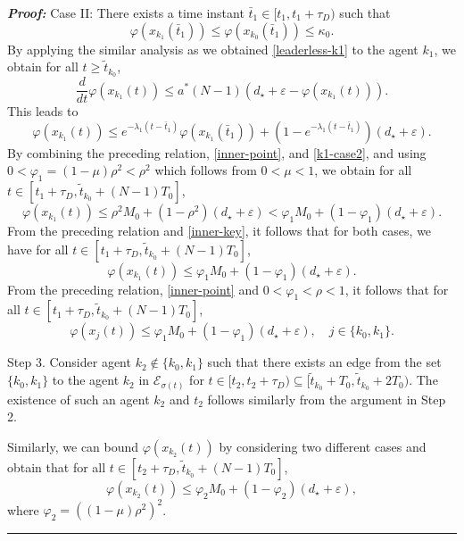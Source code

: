 \documentclass[a4paper, 11pt]{article}
\newenvironment{IEEEproof}[1][\bf Proof]{\smallskip\par\noindent\textit{#1: }}{\hspace*{\fill} \rule{6pt}{6pt}\smallskip}
\newcommand{\eps}{\varepsilon}
\begin{document}
\begin{IEEEproof}
Case II: There exists a time instant $\bar{t}_1 \in [t_1,t_1+\tau_D)$ such that
\begin{equation}\label{k1-case2}
\varphi(x_{k_1}(\bar{t}_1)) \leq \varphi(x_{k_0}(\bar{t}_1))\leq \kappa_0.
\end{equation}
By applying the similar analysis as we obtained \eqref{leaderless-k1}
to the agent $k_1$, we obtain for all $t \geq \tilde{t}_{k_0}$,
\[
\frac{d}{dt} \varphi(x_{k_1}(t))  \leq  a^* (N-1) (d_\star+\eps -\varphi(x_{k_1}(t))).
\]
This leads to
\[
\varphi(x_{k_1}(t))  \leq e^{-\lambda_1(t-\bar{t}_1)}  \varphi(x_{k_1}(\bar{t}_1))+(1-e^{-\lambda_1(t-\bar{t}_1)})(d_\star+\eps).
\]
By combining the preceding relation, \eqref{inner-point}, and \eqref{k1-case2}, and using $0<\varphi_1=(1-\mu)\rho^2<\rho^2$ which follows from $0<\mu<1$, we obtain for all  $t \in [t_1+\tau_D, \tilde{t}_{k_0}+(N-1)T_0]$,
\begin{equation*}
\varphi(x_{k_1}(t)) \leq \rho^2 M_0+(1-\rho^2)(d_\star+\eps) < \varphi_1 M_0+(1-\varphi_1)(d_\star+\eps). \label{inner-key1}
\end{equation*}
From the preceding relation and \eqref{inner-key}, it follows that for both cases, we have
for all  $t \in [t_1+\tau_D, \tilde{t}_{k_0}+(N-1)T_0]$,
\begin{equation*}\label{inner-key2}
\varphi(x_{k_1}(t)) \leq \varphi_1 M_0+(1-\varphi_1)(d_\star+\eps).
\end{equation*}
From the preceding relation, \eqref{inner-point} and $0<\varphi_1<\rho<1$,
it follows that for all $t \in [t_1+\tau_D, \tilde{t}_{k_0}+(N-1)T_0]$,
\begin{equation}\label{inner-key-01}
\varphi(x_j(t))  \leq \varphi_1 M_0+(1-\varphi_1)(d_\star+\eps), \quad j \in \{k_0,k_1\}.
\end{equation}



\vspace{2mm}

\noindent Step 3. Consider agent $k_2 \notin \{k_0,k_1\}$ such that there exists an edge from the set $\{k_0,k_1\}$ to the agent $k_2$ in $\mathcal{E}_{\sigma(t)}$ for $t \in [t_2,t_2+\tau_D) \subseteq [\tilde{t}_{k_0}+T_0,\tilde{t}_{k_0}+2T_0)$.
The existence of such an agent $k_2$ and $t_2$ follows similarly from the argument in Step 2.

Similarly, we can bound $\varphi(x_{k_2}(t))$ by considering two different cases and obtain that
for all $t \in [t_2+\tau_D, \tilde{t}_{k_0}+(N-1)T_0]$,
\begin{equation}\label{inner-key-2}
\varphi(x_{k_2}(t)) \leq \varphi_2 M_0+(1-\varphi_2)(d_\star+\eps),
\end{equation}
where $\varphi_2=((1-\mu)\rho^2)^2$.


\end{IEEEproof}
\end{document}
